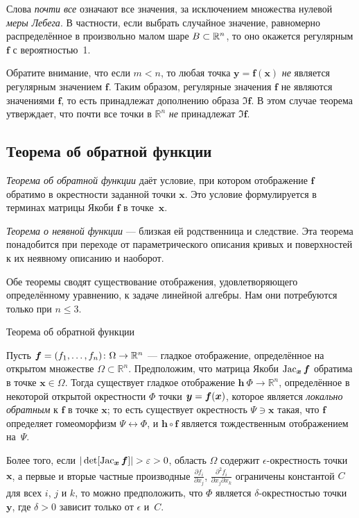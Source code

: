 Слова \emph{почти все} означают все значения, за исключением множества нулевой {}\emph{меры Лебега}.
В частности, если выбрать случайное значение, равномерно распределённое в произвольно малом шаре $B\z\subset \mathbb{R}^n$, то оно окажется регулярным $\bm{f}$ с вероятностью~1.

Обратите внимание, что если $m<n$, то любая точка $\bm{y}=\bm{f}(\bm{x})$ \textit{не} является регулярным значением $\bm{f}$.
Таким образом, регулярные значения $\bm{f}$ не являются значениями $\bm{f}$, то есть принадлежат дополнению образа $\Im \bm{f}$.
В этом случае теорема утверждает, что почти все точки в $\mathbb{R}^n$ \textit{не} принадлежат $\Im \bm{f}$.

\subsection*{Теорема об обратной функции}

{\sloppy

\emph{Теорема об обратной функции} даёт условие, при котором отображение $\bm{f}$ обратимо в окрестности заданной точки $\bm{x}$.
Это условие формулируется в терминах матрицы Якоби $\bm{f}$ в точке~$\bm{x}$.

}

\emph{Теорема о неявной функции} --- близкая ей родственница и следствие.
Эта теорема понадобится при переходе от параметрического описания кривых и поверхностей к их неявному описанию и наоборот.

Обе теоремы сводят существование отображения, удовлетворяющего определённому уравнению, к задаче линейной алгебры.
Нам они потребуются только при $n\le 3$.

\begin{thm}{Теорема об обратной функции}\label{thm:inverse}
{\sloppy
Пусть $\bm{f}=(f_1,\z\dots,f_n)\:\Omega\to\mathbb{R}^n$ --- гладкое отображение, определённое на открытом множестве $\Omega\subset \mathbb{R}^n$.
Предположим, что матрица Якоби
$\mathop{\rm Jac}\nolimits_{\bm{x}}\bm{f}$
обратима в точке $\bm{x}\in \Omega$.
Тогда существует гладкое отображение $\bm{h}\:\Phi\to\mathbb{R}^n$, определённое в некоторой открытой окрестности $\Phi$ точки ${\bm{y}}\z=\bm{f}(\bm{x})$, которое является {}\emph{локально обратным} к $\bm{f}$ в точке $\bm{x}$;
то есть существует окрестность $\Psi\ni \bm{x}$ такая, что
$\bm{f}$ определяет гомеоморфизм $\Psi\leftrightarrow \Phi$, и
$\bm{h} \circ \bm{f}$ является тождественным отображением на~$\Psi$.

}

Более того, если $|\det[\Jac_{\bm{x}}\bm{f}]|>\epsilon>0$, область $\Omega$ содержит $\epsilon$-окрестность точки $\bm{x}$, 
а первые и вторые частные производные $\tfrac{\partial f_i}{\partial x_j}$, $\tfrac{\partial^2 f_i}{\partial x_j\partial x_k}$ ограничены константой $C$ для всех $i$, $j$ и $k$, то можно предположить, что $\Phi$ является $\delta$-окрестностью точки $\bm{y}$, где $\delta>0$ зависит только от $\epsilon$ и~$C$. 
\end{thm}

